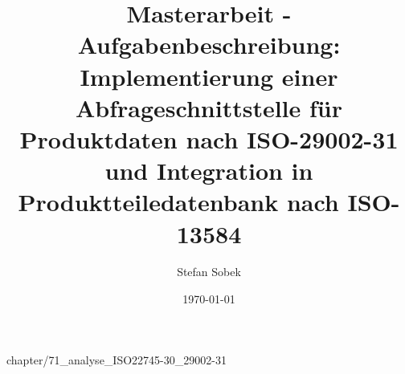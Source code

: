 \documentclass{scrreprt}
\title{Masterarbeit - Aufgabenbeschreibung:\\ Implementierung einer Abfrageschnittstelle für Produktdaten nach ISO-29002-31 und Integration in Produktteiledatenbank nach ISO-13584 }
\date{\today}
\author{Stefan Sobek}
\begin{document}
\maketitle


 {chapter/71_analyse_ISO22745-30_29002-31}

\end{document}
